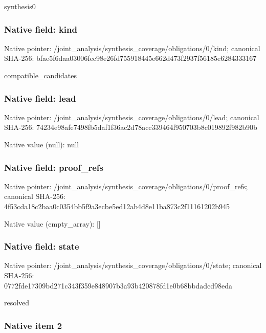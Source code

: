 \documentclass[10pt,a4paper]{article}
\begin{document}
synthesis0


\subsubsection{Native field: kind}


Native pointer: /joint\_analysis/synthesi\allowbreak{}s\_coverage/obligations/0\allowbreak{}/kind; canonical SHA-256: bfae5f6daa03006fec98e26f\allowbreak{}d755918445e662d473f2937f\allowbreak{}56185e6284333167


compatible\_candidates


\subsubsection{Native field: lead}


Native pointer: /joint\_analysis/synthesi\allowbreak{}s\_coverage/obligations/0\allowbreak{}/lead; canonical SHA-256: 74234e98afe7498fb5daf1f3\allowbreak{}6ac2d78acc339464f950703b\allowbreak{}8c019892f982b90b



Native value (null): null



\subsubsection{Native field: proof\_refs}


Native pointer: /joint\_analysis/synthesi\allowbreak{}s\_coverage/obligations/0\allowbreak{}/proof\_refs; canonical SHA-256: 4f53cda18c2baa0c0354bb5f\allowbreak{}9a3ecbe5ed12ab4d8e11ba87\allowbreak{}3c2f11161202b945



Native value (empty\_array): []



\subsubsection{Native field: state}


Native pointer: /joint\_analysis/synthesi\allowbreak{}s\_coverage/obligations/0\allowbreak{}/state; canonical SHA-256: 0772fde17309bd271c343f35\allowbreak{}9e848907b3a93b420878fd1e\allowbreak{}0b68bbdadcd98eda


resolved


\subsubsection{Native item 2}
\end{document}
